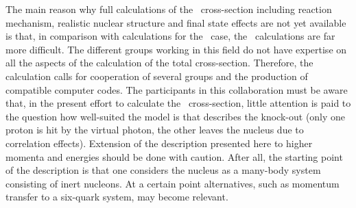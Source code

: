The main reason why full calculations of the \eepp\ cross-section including
reaction mechanism, realistic nuclear structure and final state effects are
not yet available is that, in comparison 
with calculations for the \eep\ case, the
\eepp\ calculations are far more difficult. The different groups working in this
field do not have expertise on all the aspects of the calculation of the 
total cross-section.
Therefore, the calculation calls for cooperation of several groups
and the production of compatible computer codes.
The participants in this collaboration must be aware that, in the present
effort to 
calculate the \eepp\ cross-section, little attention is paid to the question
how well-suited the model is that describes the knock-out (only one 
proton is hit by the virtual photon, the other leaves the nucleus due to 
correlation effects). Extension of the description presented here to higher 
momenta and 
energies should be done with caution. After all, the starting point of the 
description is that one considers the nucleus as a many-body system 
consisting 
of inert nucleons. At a certain point alternatives, 
such as  momentum transfer to
a six-quark system\cite{Mu86}, may become relevant.
